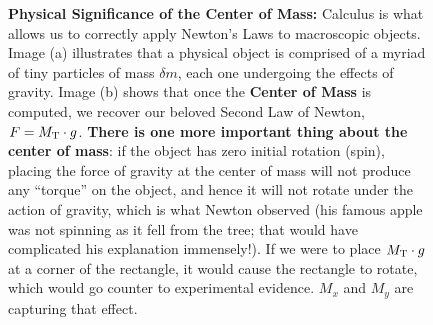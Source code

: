 
\Qed

\begin{figure}[htb]%
\centering
{}%
\hfill%
%
    \caption[]{\textbf{Physical Significance of the Center of Mass:} Calculus is what allows us to correctly apply Newton's Laws to macroscopic objects. Image (a) illustrates that a physical object is comprised of a myriad of tiny particles of mass $\delta m$, each one undergoing the effects of gravity. Image (b) shows that once the \textbf{Center of Mass} is computed, we recover our beloved Second Law of Newton, $F = M_{\rm T} \cdot g$. \textbf{There is one more important thing about the center of mass}: if the object has zero initial rotation (spin), placing the force of gravity at the center of mass will not produce any ``torque'' on the object, and hence it will not rotate under the action of gravity, which is what Newton observed (his famous apple was not spinning as it fell from the tree; that would have complicated his explanation immensely!). If we were to place $M_{\rm T} \cdot g$ at a corner of the rectangle, it would cause the rectangle to rotate, which would go counter to experimental evidence. $M_x$ and $M_y$ are capturing that effect.}
    \label{fig:PhysicalSignificancCoM}
\end{figure}

